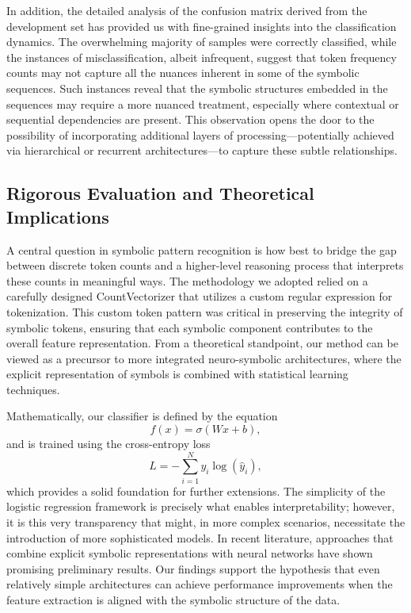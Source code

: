 \documentclass{article}
\begin{document}
In addition, the detailed analysis of the confusion matrix derived from the development set has provided us with fine-grained insights into the classification dynamics. The overwhelming majority of samples were correctly classified, while the instances of misclassification, albeit infrequent, suggest that token frequency counts may not capture all the nuances inherent in some of the symbolic sequences. Such instances reveal that the symbolic structures embedded in the sequences may require a more nuanced treatment, especially where contextual or sequential dependencies are present. This observation opens the door to the possibility of incorporating additional layers of processing—potentially achieved via hierarchical or recurrent architectures—to capture these subtle relationships.

\subsection*{Rigorous Evaluation and Theoretical Implications}
A central question in symbolic pattern recognition is how best to bridge the gap between discrete token counts and a higher-level reasoning process that interprets these counts in meaningful ways. The methodology we adopted relied on a carefully designed CountVectorizer that utilizes a custom regular expression for tokenization. This custom token pattern was critical in preserving the integrity of symbolic tokens, ensuring that each symbolic component contributes to the overall feature representation. From a theoretical standpoint, our method can be viewed as a precursor to more integrated neuro-symbolic architectures, where the explicit representation of symbols is combined with statistical learning techniques. 

Mathematically, our classifier is defined by the equation 
\[
f(x) = \sigma(Wx + b),
\]
and is trained using the cross-entropy loss
\[
L = -\sum_{i=1}^{N} y_i \log(\hat{y}_i),
\]
which provides a solid foundation for further extensions. The simplicity of the logistic regression framework is precisely what enables interpretability; however, it is this very transparency that might, in more complex scenarios, necessitate the introduction of more sophisticated models. In recent literature, approaches that combine explicit symbolic representations with neural networks have shown promising preliminary results. Our findings support the hypothesis that even relatively simple architectures can achieve performance improvements when the feature extraction is aligned with the symbolic structure of the data.
\end{document}
